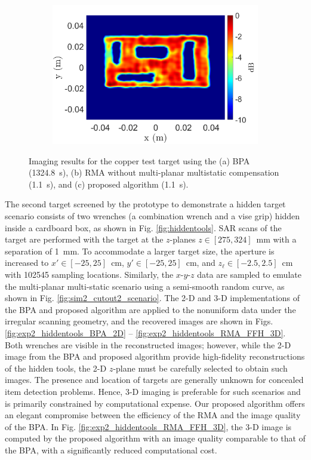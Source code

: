 \documentclass{ieeeaccess}
\begin{document}
\begin{figure}[h]
\begin{subfigure}[b]{0.23\textwidth}
         \includegraphics[width=\textwidth]{smith21.png} %
         \caption{}
         \label{fig:exp1_cutout2_RMA_FFH}
    \end{subfigure}
\caption{Imaging results for the copper test target using the (a) BPA \mbox{(1324.8 s)}, (b) RMA without multi-planar multistatic compensation \mbox{(1.1 s)}, and (c) proposed algorithm \mbox{(1.1 s)}.}
\label{fig:exp1_cutout2}
\end{figure}

The second target screened by the prototype to demonstrate a hidden target scenario consists of two wrenches (a combination wrench and a vise grip) hidden inside a cardboard box, as shown in Fig. \ref{fig:hiddentools}.
SAR scans of the target are performed with the target at the $z$-planes \mbox{$z \in [275, 324]$ mm} with a separation of \mbox{1 mm}.
To accommodate a larger target size, the aperture is increased to \mbox{$x' \in [-25,25]$ cm}, \mbox{$y' \in [-25,25]$ cm}, and \mbox{$z_\ell \in [-2.5,2.5]$ cm} with 102545 sampling locations.
Similarly, the $x$-$y$-$z$ data are sampled to emulate the multi-planar multi-static scenario using a semi-smooth random curve, as shown in Fig. \ref{fig:sim2_cutout2_scenario}.
The \mbox{2-D} and \mbox{3-D} implementations of the BPA and proposed algorithm are applied to the nonuniform data under the irregular scanning geometry, and the recovered images are shown in Figs. \ref{fig:exp2_hiddentools_BPA_2D} -- \ref{fig:exp2_hiddentools_RMA_FFH_3D}.
Both wrenches are visible in the reconstructed images; however, while the \mbox{2-D} image from the BPA and proposed algorithm provide high-fidelity reconstructions of the hidden tools, the \mbox{2-D} $z$-plane must be carefully selected to obtain such images.
The presence and location of targets are generally unknown for concealed item detection problems. 
Hence, \mbox{3-D} imaging is preferable for such scenarios and is primarily constrained by computational expense.
Our proposed algorithm offers an elegant compromise between the efficiency of the RMA and the image quality of the BPA.
In Fig. \ref{fig:exp2_hiddentools_RMA_FFH_3D}, the \mbox{3-D} image is computed by the proposed algorithm with an image quality comparable to that of the BPA, with a significantly reduced computational cost. 
\end{document}
